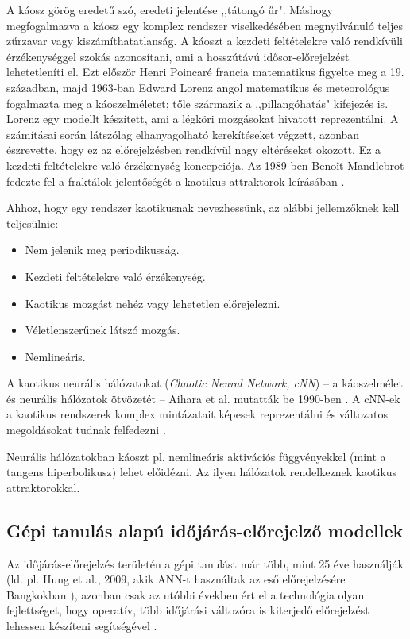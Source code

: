 \documentclass[12pt,a4paper]{article}
\begin{document}
A káosz görög eredetű szó, eredeti jelentése ,,tátongó űr". Máshogy megfogalmazva a káosz egy komplex rendszer viselkedésében megnyilvánuló teljes zűrzavar vagy kiszámíthatatlanság. A káoszt a kezdeti feltételekre való rendkívüli érzékenységgel szokás azonosítani, ami a hosszútávú idősor-előrejelzést lehetetleníti el. Ezt először Henri Poincaré francia matematikus figyelte meg a 19. században, majd 1963-ban Edward Lorenz angol matematikus és meteorológus fogalmazta meg a káoszelméletet; tőle származik a ,,pillangóhatás" kifejezés is. Lorenz egy modellt készített, ami a légköri mozgásokat hivatott reprezentálni. A számításai során látszólag elhanyagolható kerekítéseket végzett, azonban észrevette, hogy ez az előrejelzésben rendkívül nagy eltéréseket okozott. Ez a kezdeti feltételekre való érzékenység koncepciója. Az 1989-ben Benoît Mandlebrot fedezte fel a fraktálok jelentőségét a kaotikus attraktorok leírásában \cite{biswas_chaos_2018, anusree_understanding_2025}. 

Ahhoz, hogy egy rendszer kaotikusnak nevezhessünk, az alábbi jellemzőknek kell teljesülnie:
\begin{itemize}
    \item Nem jelenik meg periodikusság.
    \item Kezdeti feltételekre való érzékenység.
    \item Kaotikus mozgást nehéz vagy lehetetlen előrejelezni.
    \item Véletlenszerűnek látszó mozgás.
    \item Nemlineáris.
\end{itemize}

A kaotikus neurális hálózatokat (\textit{Chaotic Neural Network, cNN}) -- a káoszelmélet és neurális hálózatok ötvözetét -- Aihara et al. mutatták be 1990-ben \cite{aihara_chaotic_1990}.  A cNN-ek a kaotikus rendszerek komplex mintázatait képesek reprezentálni és változatos megoldásokat tudnak felfedezni \cite{anusree_understanding_2025}. 

Neurális hálózatokban káoszt pl. nemlineáris aktivációs függvényekkel (mint a tangens hiperbolikusz) lehet előidézni. Az ilyen hálózatok rendelkeznek kaotikus attraktorokkal. 

\subsection{Gépi tanulás alapú időjárás-előrejelző modellek}

Az időjárás-előrejelzés területén a gépi tanulást már több, mint 25 éve használják (ld. pl. Hung et al., 2009, akik ANN-t használtak az eső előrejelzésére Bangkokban \cite{hung_artificial_2009}), azonban csak az utóbbi években ért el a technológia olyan fejlettséget, hogy operatív, több időjárási változóra is kiterjedő előrejelzést lehessen készíteni segítségével \cite{de_burgh-day_machine_2023}. 
\end{document}

